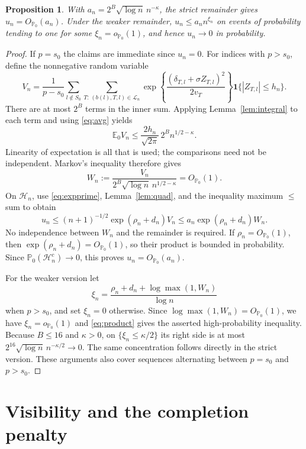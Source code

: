 \documentclass[11pt]{article}
\newtheorem{proposition}{Proposition}
\theoremstyle{remark}\newtheorem{remark}{Remark}
\newcommand{\PP}{\mathbb P_0}
\newcommand{\EE}{\mathbb E_0}
\newcommand{\op}{o_{\PP}}
\newcommand{\Op}{O_{\PP}}
\newcommand{\ind}{\mathbf 1}
\newcommand{\Lc}{\mathcal L_n}
\begin{document}
\begin{proposition}\label{prop:un}
With $a_n=2^B\sqrt{\log n}\,n^{-\kappa}$, the strict remainder gives
$u_n=\Op(a_n)$. Under the weaker remainder,
$u_n\le a_n n^{\xi_n}$ on events of probability tending to one for some
$\xi_n=\op(1)$, and hence $u_n\to0$ in probability.
\end{proposition}

\begin{proof}
If $p=s_0$ the claims are immediate since $u_n=0$. For indices with
$p>s_0$, define the nonnegative random variable
\[
 V_n=\frac1{p-s_0}\sum_{l\notin S_0}
 \sum_{T:\,(b(l),T,l)\in\Lc}
 \exp\!\left\{\frac{(\delta_{T,l}+\sigma Z_{T,l})^2}{2v_T}\right\}
 \ind\{|Z_{T,l}|\le h_n\}.
\]
There are at most $2^B$ terms in the inner sum. Applying
Lemma~\ref{lem:integral} to each term and using \eqref{eq:avg} yields
\begin{equation}\label{eq:EV}
 \EE V_n\le\frac{2h_n}{\sqrt{2\pi}}\,2^B n^{1/2-\kappa}.
\end{equation}
Linearity of expectation is all that is used; the comparisons need not be
independent. Markov's inequality therefore gives
\begin{equation}\label{eq:Vnorm}
 W_n:=\frac{V_n}{2^B\sqrt{\log n}\,n^{1/2-\kappa}}=\Op(1).
\end{equation}
On $\mathcal H_n$, use \eqref{eq:expprime}, Lemma~\ref{lem:quad}, and
the inequality maximum $\le$ sum to obtain
\begin{equation}\label{eq:product}
 u_n\le(n+1)^{-1/2}\exp(\rho_n+d_n)V_n
 \le a_n\exp(\rho_n+d_n)W_n.
\end{equation}
No independence between $W_n$ and the remainder is required. If
$\rho_n=\Op(1)$, then $\exp(\rho_n+d_n)=\Op(1)$, so their product
is bounded in probability. Since $\PP(\mathcal H_n^c)\to0$, this proves
$u_n=\Op(a_n)$.

For the weaker version let
\[
 \xi_n=\frac{\rho_n+d_n+\log\max(1,W_n)}{\log n}
\]
when $p>s_0$, and set $\xi_n=0$ otherwise. Since
$\log\max(1,W_n)=\Op(1)$, we have $\xi_n=\op(1)$ and
\eqref{eq:product} gives the asserted high-probability inequality.
Because $B\le16$ and $\kappa>0$, on $\{\xi_n\le\kappa/2\}$ its
right side is at most $2^{16}\sqrt{\log n}\,n^{-\kappa/2}\to0$.
The same concentration follows directly in the strict version. These
arguments also cover sequences alternating between $p=s_0$ and $p>s_0$.
\end{proof}

\section{Visibility and the completion penalty}
\end{document}
